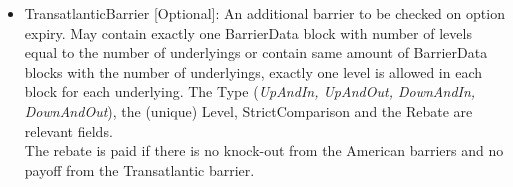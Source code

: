 \begin{itemize}
\item TransatlanticBarrier [Optional]: An additional barrier to be checked on option expiry. May contain exactly one
  BarrierData block with number of levels equal to the number of underlyings or contain same amount of BarrierData blocks with
  the number of underlyings, exactly one level is allowed in each block for each underlying. The Type (\emph{UpAndIn, UpAndOut, DownAndIn, DownAndOut}), the (unique) Level, StrictComparison and the Rebate are relevant fields. \\
  The rebate is paid if there is no knock-out from the American barriers and no payoff from the Transatlantic barrier. 



\end{itemize}


